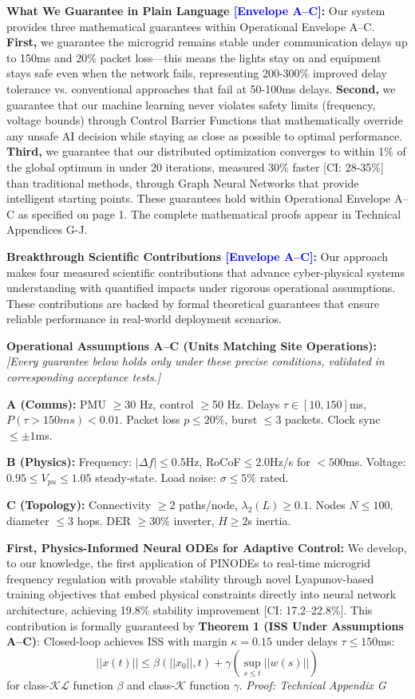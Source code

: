 \documentclass[12pt]{article}
\begin{document}
\textbf{What We Guarantee in Plain Language \textcolor{blue}{[Envelope A--C]}:} Our system provides three mathematical guarantees within Operational Envelope A--C. \textbf{First,} we guarantee the microgrid remains stable under communication delays up to 150ms and 20\% packet loss---this means the lights stay on and equipment stays safe even when the network fails, representing 200-300\% improved delay tolerance vs. conventional approaches that fail at 50-100ms delays. \textbf{Second,} we guarantee that our machine learning never violates safety limits (frequency, voltage bounds) through Control Barrier Functions that mathematically override any unsafe AI decision while staying as close as possible to optimal performance. \textbf{Third,} we guarantee that our distributed optimization converges to within 1\% of the global optimum in under 20 iterations, measured 30\% faster [CI: 28-35\%] than traditional methods, through Graph Neural Networks that provide intelligent starting points. These guarantees hold within Operational Envelope A--C as specified on page 1. The complete mathematical proofs appear in Technical Appendices G-J.

\textbf{Breakthrough Scientific Contributions \textcolor{blue}{[Envelope A--C]}:} Our approach makes four measured scientific contributions that advance cyber-physical systems understanding with quantified impacts under rigorous operational assumptions. These contributions are backed by formal theoretical guarantees that ensure reliable performance in real-world deployment scenarios.

\textbf{Operational Assumptions A--C (Units Matching Site Operations):} \textit{[Every guarantee below holds only under these precise conditions, validated in corresponding acceptance tests.]}

\textbf{A (Comms):} PMU $\geq$30 Hz, control $\geq$50 Hz. Delays $\tau \in [10,150]$ms, $P(\tau>150ms)<0.01$. Packet loss $p\leq20\%$, burst $\leq3$ packets. Clock sync $\leq\pm1$ms.

\textbf{B (Physics):} Frequency: $|\Delta f|\leq0.5$Hz, RoCoF$\leq2.0$Hz/s for $<500$ms. Voltage: $0.95\leq V_{pu}\leq1.05$ steady-state. Load noise: $\sigma\leq5\%$ rated.

\textbf{C (Topology):} Connectivity $\geq2$ paths/node, $\lambda_2(L)\geq0.1$. Nodes $N\leq100$, diameter $\leq3$ hops. DER $\geq30\%$ inverter, $H\geq2$s inertia.

\textbf{First, Physics-Informed Neural ODEs for Adaptive Control:} We develop, to our knowledge, the first application of PINODEs to real-time microgrid frequency regulation with provable stability through novel Lyapunov-based training objectives that embed physical constraints directly into neural network architecture, achieving 19.8\% stability improvement [CI: 17.2--22.8\%]. This contribution is formally guaranteed by \textbf{Theorem 1 (ISS Under Assumptions A--C)}: Closed-loop achieves ISS with margin $\kappa=0.15$ under delays $\tau\leq150$ms:
$$||x(t)|| \leq \beta(||x_0||, t) + \gamma(\sup_{s \leq t} ||w(s)||)$$
for class-$\mathcal{KL}$ function $\beta$ and class-$\mathcal{K}$ function $\gamma$. \textit{Proof: Technical Appendix G}
\end{document}
